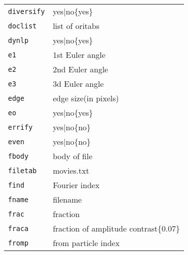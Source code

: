\documentclass[a4paper,11pt]{article}
\begin{document}
\begin{tabular}{ll}
\texttt{diversify}&{yes|no\{yes\}}\\
\texttt{doclist}&{list of oritabs}\\
\texttt{dynlp}&{yes|no\{yes\}}\\
\texttt{e1}&{1st Euler angle}\\
\texttt{e2}&{2nd Euler angle}\\
\texttt{e3}&{3d Euler angle}\\
\texttt{edge}&{edge size(in pixels)}\\
\texttt{eo}&{yes|no\{yes\}}\\
\texttt{errify}&{yes|no\{no\}}\\
\texttt{even}&{yes|no\{no\}}\\
\texttt{fbody}&{body of file}\\
\texttt{filetab}&{movies.txt}\\
\texttt{find}&{Fourier index}\\
\texttt{fname}&{filename}\\
\texttt{frac}&{fraction}\\
\texttt{fraca}&{fraction of amplitude contrast\{0.07\}}\\
\texttt{fromp}&{from particle index}\\
\end{tabular}
\end{document}
